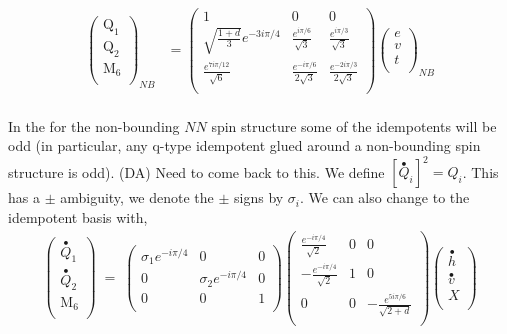 \documentclass[12pt,a4paper]{article}
\newcommand{\dave}[1]{{\color{ao(english)}\footnotesize{(DA) #1}}}
\begin{document}
\begin{align}
\left( \begin{matrix}
\text{Q}_1\\
\text{Q}_2\\
\text{M}_6\\
\end{matrix} \right)_{NB}
&= \left( \begin{matrix}
1 & 0 & 0 \\
\sqrt{\frac{1+d}{3}} e^{-3i \pi /4} & \frac{e^{i \pi /6}}{\sqrt{3}} & \frac{e^{i \pi /3}}{\sqrt{3}} \\
\frac{e^{7 i \pi /12}}{\sqrt{6}} & \frac{e^{- i \pi / 6}}{2 \sqrt{3}} & \frac{e^{-2 i \pi /3}}{2 \sqrt{3}}\\
\end{matrix} \right)
\left( \begin{matrix}
e\\
v\\
t\\
\end{matrix} \right)_{NB} \\
\end{align}

In the for the non-bounding $NN$ spin structure some of the idempotents will be odd (in particular, any q-type idempotent glued around a non-bounding spin structure is odd).
\dave{Need to come back to this.}
We define $\left[ \stackrel{\bullet}{Q}_{i}\right]^2  = Q_i$. 
This has a $\pm$ ambiguity, we denote the $\pm$ signs by $\sigma_i$. 
We can also change to the idempotent basis with,
\begin{align}
\label{VPP}
\left( \begin{matrix}
\stackrel{\bullet}{Q}_{1}\\
\stackrel{\bullet}{Q}_{2}\\
\text{M}_6 \\ 
\end{matrix} \right) \; =\;
\left( \begin{matrix}
\sigma_1 e^{- i \pi /4} &0&0\\
0&\sigma_2 e^{- i \pi /4} &0\\
0&0&1 \\
\end{matrix} \right)
\left( \begin{matrix}
\frac{e^{- i \pi /4}}{\sqrt{2}} & 0&0 \\
- \frac{e^{- i \pi /4}}{\sqrt{2}} & 1 & 0 \\
0 & 0& - \frac{e^{5 i \pi /6}}{\sqrt{2 + d}}\\
\end{matrix} \right)
\left( \begin{matrix}
\stackrel{\bullet}{h} \\
\stackrel{\bullet}{v} \\
X \\
\end{matrix} \right)
\end{align}
\end{document}
